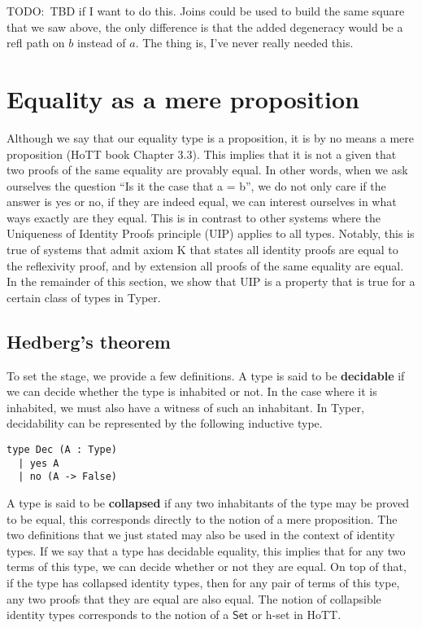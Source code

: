 \documentclass[12pt,twoside,maitrise]{dms}
\theoremstyle{definition}
\numberwithin{equation}{section}
\numberwithin{table}{chapter}
\numberwithin{figure}{chapter}
\newcommand\kw[1] {\textsf{#1}}
\begin{document}
TODO:\ TBD if I want to do this. Joins could be used to build the same square
that we saw above, the only difference is that the added degeneracy would be
a refl path on $b$ instead of $a$. The thing is, I've never really needed
this.

\section{Equality as a mere proposition}
Although we say that our equality type is a proposition, it is by no means a
mere proposition (HoTT book\cite{HoTTbook} Chapter 3.3). This implies that it is
not a given that two proofs of the same equality are provably
equal\cite{hofmann1998groupoid}. In other words, when we ask ourselves the
question ``Is it the case that a = b'', we do not only care if the answer is yes
or no, if they are indeed equal, we can interest ourselves in what ways exactly
are they equal. This is in contrast to other systems where the Uniqueness of
Identity Proofs principle (UIP) applies to all types. Notably, this is true of
systems that admit axiom K\cite{streicher1993investigations} that states all
identity proofs are equal to the reflexivity proof, and by extension all proofs
of the same equality are equal. In the remainder of this section, we show that
UIP is a property that is true for a certain class of types in Typer.

\subsection{Hedberg's theorem}\label{subsec:hedberg}


To set the stage, we provide a few definitions. A type is said to be
\textbf{decidable} if we can decide whether the type is inhabited or
not. In the case where it is inhabited, we must also have a witness of such an
inhabitant. In Typer, decidability can be represented by the following inductive
type.

\begin{verbatim}
type Dec (A : Type)
  | yes A
  | no (A -> False)
\end{verbatim}

A type is said to be \textbf{collapsed} if any two inhabitants of the type may
be proved to be equal, this corresponds directly to the notion of a mere
proposition. The two definitions that we just stated may also be used in the
context of identity types. If we say that a type has decidable equality,
this implies that for any two terms of this type, we can decide whether or not
they are equal. On top of that, if the type has collapsed identity types, then
for any pair of terms of this type, any two proofs that they are equal are also
equal. The notion of collapsible identity types corresponds to the notion of a
$\kw{Set}$ or h-set in HoTT.
\end{document}
